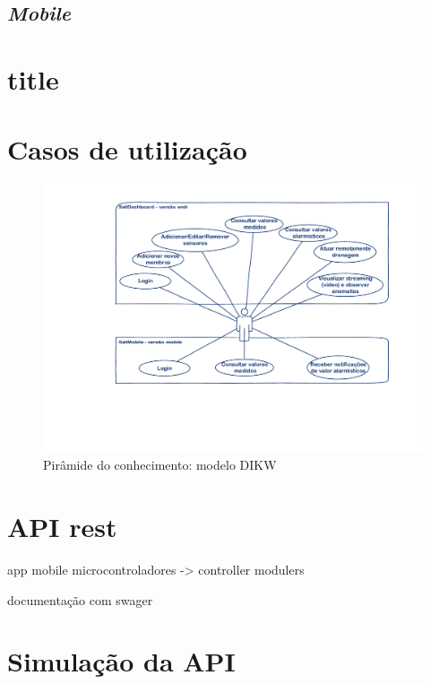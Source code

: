 \subsection{\textit{Mobile}}





\section{title}
\newpage 

\section{Casos de utilização}

\begin{figure}[!htb]
	\centering
	\includegraphics[scale=0.5]{esquemas/usecases.pdf}
	\caption{Pirâmide do conhecimento: modelo DIKW}
	\label{dikw}
\end{figure}








\section{API rest}



app mobile
microcontroladores -> controller modulers 


documentação com swager 





\section{Simulação da API}


